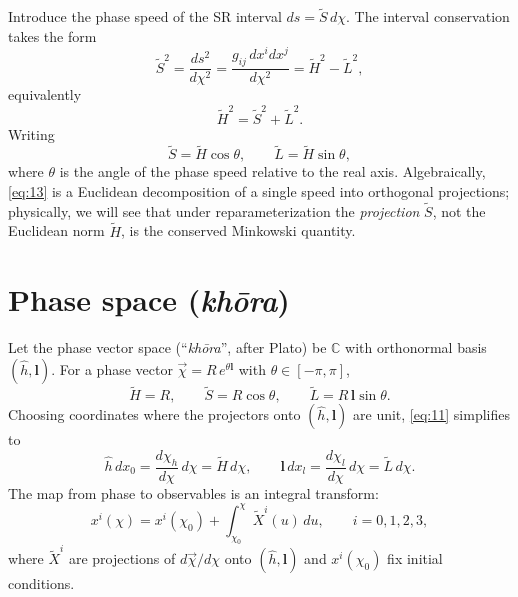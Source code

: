 \documentclass[11pt]{article}
\numberwithin{equation}{section}
\begin{document}
Introduce the phase speed of the SR interval $ds=\tilde{S}\,d\chi$. The interval conservation takes the form
\begin{equation}
\tilde{S}^2=\frac{ds^2}{d\chi^2}
=\frac{g_{ij}\,dx^i dx^j}{d\chi^2}
=\tilde{H}^2-\tilde{L}^2,
\label{eq:12}
\end{equation}
equivalently
\begin{equation}
\tilde{H}^2=\tilde{S}^2+\tilde{L}^2.
\label{eq:13}
\end{equation}
Writing 
\begin{equation}
\tilde{S}=\tilde{H}\cos\theta,\qquad \tilde{L}=\tilde{H}\sin\theta,
\label{eq:14}
\end{equation}
where $\theta$ is the angle of the phase speed relative to the real axis. Algebraically, \eqref{eq:13} is a Euclidean decomposition of a single speed into orthogonal projections; physically, we will see that under reparameterization the \emph{projection} $\tilde{S}$, not the Euclidean norm $\tilde{H}$, is the conserved Minkowski quantity.

\section{Phase space (\textit{kh\={o}ra})}
Let the phase vector space (``\emph{kh\={o}ra}'', after Plato) be $\mathbb{C}$ with orthonormal basis $(\hat{h},\mathbf{l})$. For a phase vector $\vec{\chi}=R\,e^{\theta\mathbf{l}}$ with $\theta\in[-\pi,\pi]$,
\begin{equation}
\tilde{H}=R,\qquad \tilde{S}=R\cos\theta,\qquad \tilde{L}=R\,\mathbf{l}\sin\theta.
\label{eq:21}
\end{equation}
Choosing coordinates where the projectors onto $(\hat{h},\mathbf{l})$ are unit, \eqref{eq:11} simplifies to
\begin{equation}
\hat{h}\,dx_0=\frac{d\chi_h}{d\chi}\,d\chi=\tilde{H}\,d\chi,\qquad
\mathbf{l}\,dx_l=\frac{d\chi_l}{d\chi}\,d\chi=\tilde{L}\,d\chi.
\label{eq:22}
\end{equation}
The map from phase to observables is an integral transform:
\begin{equation}
x^i(\chi)=x^i(\chi_0)+\int_{\chi_0}^{\chi}\tilde{X}^i(u)\,du,\qquad i=0,1,2,3,
\label{eq:23}
\end{equation}
where $\tilde{X}^i$ are projections of $d\vec{\chi}/d\chi$ onto $(\hat{h},\mathbf{l})$ and $x^i(\chi_0)$ fix initial conditions.
\end{document}
